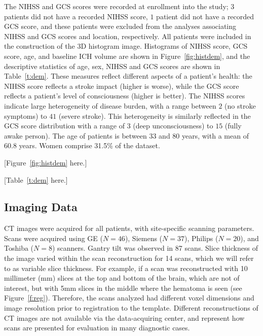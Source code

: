 \documentclass[10pt]{article}\usepackage[]{graphicx}\usepackage[]{color}
\begin{document}
%
                 
The NIHSS and GCS scores were recorded at enrollment into the study; $3$ patients did not have a recorded NIHSS score, $1$ patient did not have a recorded GCS score, and these patients were excluded from the analyses associating NIHSS and GCS scores and location, respectively.  All patients were included in the construction of the 3D histogram image.  Histograms of NIHSS score, GCS score, age, and baseline ICH volume are shown in Figure~\ref{fig:histdem}, and the descriptive statistics of age, sex, NIHSS and GCS scores are shown in Table~\ref{t:dem}. These measures reflect different aspects of a patient's health: the NIHSS score reflects a stroke impact (higher is worse), while the GCS score reflects a patient's level of consciousness (higher is better).  The NIHSS scores indicate large heterogeneity of disease burden, with a range between $2$ (no stroke symptoms) to $41$ (severe stroke).  This heterogeneity is similarly reflected in the GCS score distribution with a range of $3$ (deep unconsciousness) to $15$ (fully awake person). The age of patients is between 33 and 80 years, with a mean of 60.8 years.  Women comprise 31.5\% of the dataset.

[Figure~\ref{fig:histdem} here.]

[Table~\ref{t:dem} here.]



\subsection{Imaging Data}
CT images were acquired for all patients, with site-specific scanning parameters.  Scans were acquired using GE ($N=46$), Siemens ($N=37$), Philips ($N=20$), and Toshiba ($N=8$) scanners. Gantry tilt was observed in 87 scans.  Slice thickness of the image varied within the scan reconstruction for 14 scans, which we will refer to  as variable slice thickness. For example, if a scan was reconstructed with 10 millimeter (mm) slices at the top and bottom of the brain, which are not of interest, but with 5mm slices in the middle where the hematoma is seen (see Figure~\ref{f:reg}\protect{}).  Therefore, the scans analyzed had different voxel dimensions and image resolution prior to registration to the template.  Different reconstructions of CT images are not available via the data-acquiring center, and represent how scans are presented for evaluation in many diagnostic cases.
\end{document}
